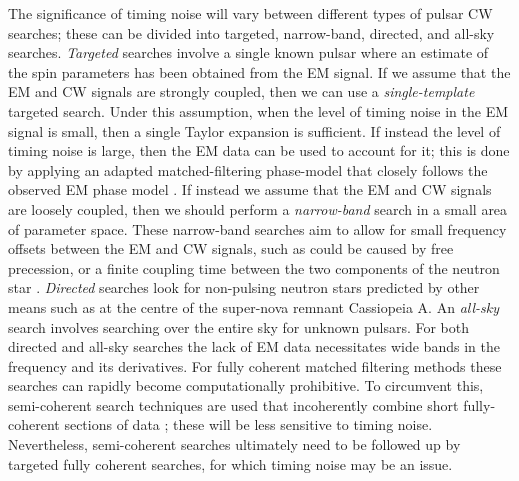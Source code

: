 \documentclass[../full_thesis/full_thesis.tex]{subfiles}
\begin{document}
The significance of timing noise will vary between different types of pulsar CW
searches; these can be divided into targeted, narrow-band, directed, and
all-sky searches.  \emph{Targeted} searches involve a single known pulsar where
an estimate of the spin parameters has been obtained from the EM signal. If we
assume that the EM and CW signals are strongly coupled, then we can use a
\emph{single-template} targeted search. Under this assumption, when the level
of timing noise in the EM signal is small, then a single Taylor expansion is
sufficient.  If instead the level of timing noise is large, then the EM data
can be used to account for it; this is done by applying an adapted
matched-filtering phase-model that closely follows the observed EM phase model
\citep{Pitkin2004}. If instead we assume that the EM and CW signals are
loosely coupled, then we should perform a \emph{narrow-band} search in a small
area of parameter space.  These narrow-band searches aim to allow for small
frequency offsets between the EM and CW signals, such as could be caused by
free precession, or a finite coupling time between the two components of the
neutron star \citep{LIGO2008}. \emph{Directed} searches look for non-pulsing
neutron stars predicted by other means such as at the centre of the super-nova
remnant Cassiopeia A. An \emph{all-sky} search involves searching over the
entire sky for unknown pulsars. For both directed and all-sky searches the lack
of EM data necessitates wide bands in the frequency and its derivatives. For
fully coherent matched filtering methods these searches can rapidly become
computationally prohibitive. To circumvent this, semi-coherent search
techniques are used that incoherently combine short fully-coherent sections of
data \citep{LIGO2012}; these will be less sensitive to timing noise.
Nevertheless, semi-coherent searches  ultimately need to be followed up by
targeted fully coherent searches, for which timing noise may be an issue.
\end{document}
